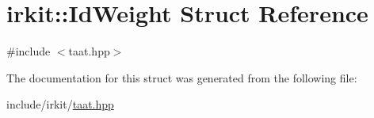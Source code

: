 \hypertarget{structirkit_1_1IdWeight}{}\section{irkit\+:\+:Id\+Weight Struct Reference}
\label{structirkit_1_1IdWeight}


{\ttfamily \#include $<$taat.\+hpp$>$}



The documentation for this struct was generated from the following file\+:\begin{DoxyCompactItemize}
\item 
include/irkit/\mbox{\hyperlink{taat_8hpp}{taat.\+hpp}}\end{DoxyCompactItemize}
